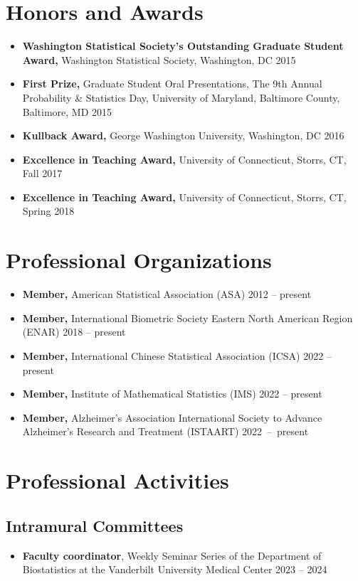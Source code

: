 \documentclass[12pt]{article}
\begin{document}
	\section*{Honors and Awards}
	\begin{itemize}
		\item {\bf Washington Statistical Society's Outstanding Graduate Student Award,} Washington Statistical Society, Washington, DC \hfill 2015
		\item {\bf First Prize,} Graduate Student Oral Presentations, The 9th Annual Probability \& Statistics Day,  University of Maryland, Baltimore County, Baltimore, MD \hfill 2015
		\item {\bf Kullback Award,} George Washington University, Washington, DC \hfill 2016
		\item {\bf Excellence in Teaching Award,} University of Connecticut, Storrs, CT, \hfill Fall 2017
		\item {\bf Excellence in Teaching Award,} University of Connecticut, Storrs, CT, \hfill Spring 2018
	\end{itemize}
		
	\section*{Professional Organizations}
	\begin{itemize}
		\item {\bf Member,} American Statistical Association (ASA) \hfill 2012 -- present
		\item {\bf Member,} International Biometric Society Eastern North American Region (ENAR) \hfill 2018 -- present
		\item {\bf Member,} International Chinese Statistical Association (ICSA) \hfill 2022 -- present
		\item {\bf Member,} Institute of Mathematical Statistics (IMS) \hfill 2022 -- present
		\item {\bf Member,} Alzheimer's Association International 
		Society to Advance Alzheimer's Research and Treatment 
		(ISTAART) \hfill \mbox{2022 -- present}
	\end{itemize}

	\section*{Professional Activities}
	
	\subsection*{Intramural Committees}
	\begin{itemize}
		\item {\bf Faculty coordinator}, Weekly Seminar Series of 
		the Department of Biostatistics at the Vanderbilt University 
		Medical Center \hfill 2023 -- 2024
	\end{itemize}
	
\end{document}
